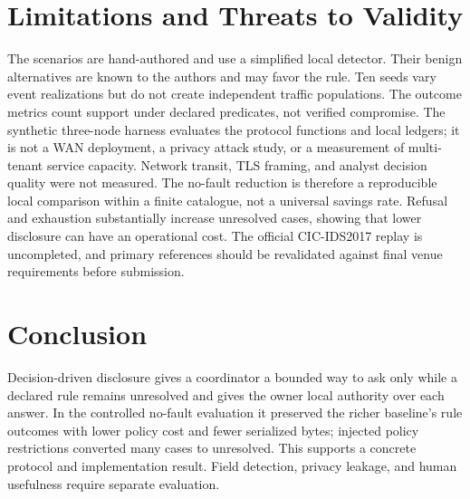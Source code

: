 \documentclass[conference,letterpaper]{IEEEtran}
\begin{document}
\section{Limitations and Threats to Validity}
The scenarios are hand-authored and use a simplified local detector. Their benign alternatives are known to the authors and may favor the rule. Ten seeds vary event realizations but do not create independent traffic populations. The outcome metrics count support under declared predicates, not verified compromise. The synthetic three-node harness evaluates the protocol functions and local ledgers; it is not a WAN deployment, a privacy attack study, or a measurement of multi-tenant service capacity. Network transit, TLS framing, and analyst decision quality were not measured. The no-fault reduction is therefore a reproducible local comparison within a finite catalogue, not a universal savings rate. Refusal and exhaustion substantially increase unresolved cases, showing that lower disclosure can have an operational cost. The official CIC-IDS2017 replay is uncompleted, and primary references should be revalidated against final venue requirements before submission.

\section{Conclusion}
Decision-driven disclosure gives a coordinator a bounded way to ask only while a declared rule remains unresolved and gives the owner local authority over each answer. In the controlled no-fault evaluation it preserved the richer baseline's rule outcomes with lower policy cost and fewer serialized bytes; injected policy restrictions converted many cases to unresolved. This supports a concrete protocol and implementation result. Field detection, privacy leakage, and human usefulness require separate evaluation.
\end{document}
